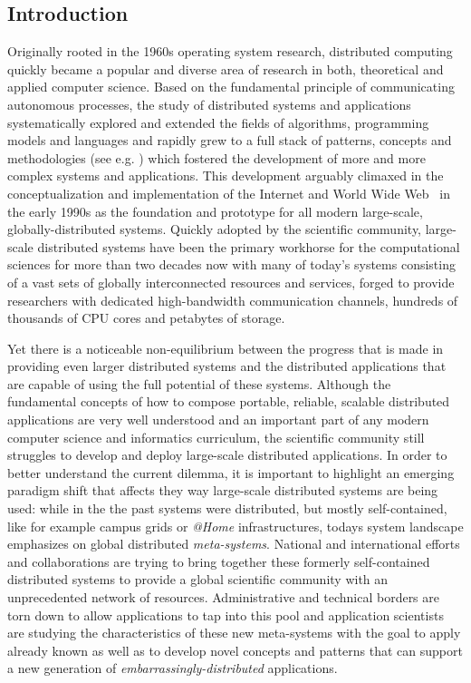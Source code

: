 \documentclass[a4paper,10pt]{article}
\begin{document}
\subsection*{Introduction}

 Originally rooted in the 1960s operating system research, distributed computing 
 quickly became a popular and diverse area of research in both, theoretical and applied 
 computer science. Based on the fundamental principle of communicating autonomous processes, 
 the study of distributed systems and applications systematically explored and extended the 
 fields of algorithms, programming models and languages and rapidly grew to a full stack of 
 patterns, concepts and methodologies (see e.g. \cite{519301}) which fostered the development 
 of more and more complex systems and applications. This development arguably climaxed in the  
 conceptualization and implementation of the Internet and World Wide Web~\cite{Berners-lee92world-wideweb} 
 in the early 1990s as the foundation and prototype for all modern large-scale, globally-distributed 
 systems. Quickly adopted by the scientific community, large-scale distributed systems have 
 been the primary workhorse for the computational sciences for more than two decades now 
 with many of today's systems consisting of a vast sets of globally interconnected resources 
 and services, forged to provide researchers with dedicated high-bandwidth communication 
 channels, hundreds of thousands of CPU cores and petabytes of storage.
 
 Yet there is a noticeable non-equilibrium between the progress that is made in providing
 even larger distributed systems and the distributed applications that are capable of
 using the full potential of these systems. Although the fundamental concepts of how to 
 compose portable, reliable, scalable distributed applications are very well understood and an 
 important part of any modern computer science and informatics curriculum, 
 the scientific community still struggles to develop and deploy large-scale distributed applications.
 In order to better understand the current dilemma, it is important to highlight an emerging paradigm 
 shift that affects they way large-scale distributed systems are being used: while in the the past 
 systems were distributed, but mostly self-contained, like for example campus grids or \textit{@Home}   
 infrastructures, todays system landscape emphasizes on global distributed \textit{meta-systems}. 
 National and international efforts and collaborations are trying to bring together these formerly
 self-contained distributed systems to provide a global scientific community with an unprecedented 
 network of resources. Administrative and technical borders are torn down to allow applications 
 to tap into this pool and application scientists are studying the characteristics of these new 
 meta-systems with the goal to apply already known as well as to develop novel concepts and 
 patterns that can support a new generation of \textit{embarrassingly-distributed} applications.
 
\end{document}

